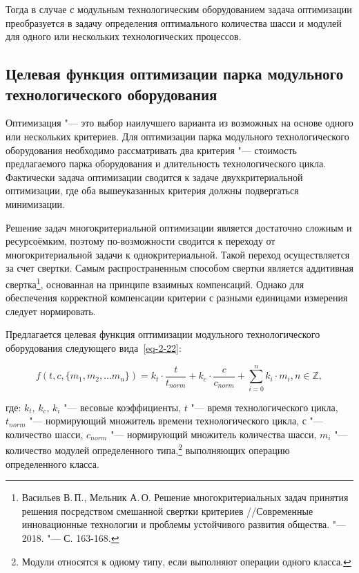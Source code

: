Тогда в случае с модульным технологическим оборудованием задача оптимизации преобразуется в задачу определения оптимального количества шасси и модулей для одного или нескольких технологических процессов.

\subsection{Целевая функция оптимизации парка модульного технологического оборудования}

Оптимизация "--- это выбор наилучшего варианта из возможных на основе одного или нескольких критериев. Для оптимизации парка модульного технологического оборудования необходимо рассматривать два критерия "--- стоимость предлагаемого парка оборудования и длительность технологического цикла. Фактически задача оптимизации сводится к задаче двухкритериальной оптимизации, где оба вышеуказанных критерия должны подвергаться минимизации.

Решение задач многокритериальной оптимизации является достаточно сложным и ресурсоёмким, поэтому по-возможности сводится к переходу от многокритериальной задачи к однокритериальной. Такой переход осуществляется за счет свертки. Самым распространенным способом свертки является аддитивная свертка\footnote{Васильев В.\,П., Мельник А.\,О. Решение многокритериальных задач принятия решения посредством смешанной свертки критериев //Современные инновационные технологии и проблемы устойчивого развития общества. "--- 2018. "--- С. 163-168.}, основанная на принципе взаимных компенсаций. Однако для обеспечения корректной компенсации критерии с разными единицами измерения следует нормировать.
 
Предлагается целевая функция оптимизации модульного технологического оборудования следующего вида~\cref{eq-2-22}:

\begin{equation}
f(t, c, \{m_1, m_2, \ldots m_n \}) = k_t \cdot \frac{t}{t_{norm}} + k_c \cdot \frac{c}{c_{norm}} + \sum_{i=0}^{n}k_i \cdot m_i, n \in \mathbb{Z},
\label{eq-2-22}
\end{equation}

\noindent где:
\noindent $k_t$, $k_c$, $k_i$ "--- весовые коэффициенты,
\noindent $t$ "--- время технологического цикла,
\noindent $t_{norm}$ "--- нормирующий множитель времени технологического цикла,
\noindent $с$ "--- количество шасси,
\noindent $c_{norm}$ "--- нормирующий множитель количества шасси,
\noindent $m_i$ "--- количество модулей определенного типа,\footnote{Модули относятся к одному типу, если выполняют операции одного класса.} выполняющих операцию определенного класса.

